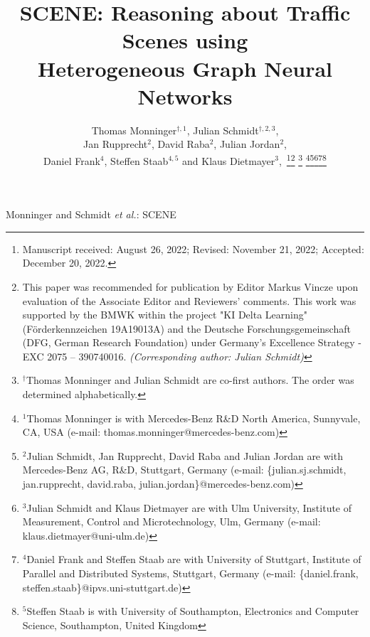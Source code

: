 \documentclass[letterpaper, 10 pt, journal, twoside]{IEEEtran}
\begin{document}
\title{SCENE: Reasoning about Traffic Scenes using\\Heterogeneous Graph Neural Networks}

\author{Thomas Monninger$^{\dagger, 1}$, Julian Schmidt$^{\dagger, 2, 3}$,\\Jan Rupprecht$^{2}$, David Raba$^{2}$, Julian Jordan$^{2}$,\\Daniel Frank$^{4}$, Steffen Staab$^{4, 5}$ and Klaus Dietmayer$^{3}$,~\thanks{Manuscript received: August 26, 2022; Revised: November 21, 2022; Accepted: December 20, 2022.}\thanks{This paper was recommended for publication by Editor Markus Vincze upon evaluation of the Associate Editor and Reviewers' comments.
This work was supported by the BMWK within the project "KI Delta Learning" (F\"orderkennzeichen 19A19013A) and the Deutsche Forschungsgemeinschaft (DFG, German Research Foundation) under Germany's Excellence Strategy - EXC 2075 – 390740016. \textit{(Corresponding author: Julian Schmidt)}} \thanks{$^{\dagger}$Thomas Monninger and Julian Schmidt are co-first authors. The order was determined alphabetically.}
\thanks{$^{1}$Thomas Monninger is with Mercedes-Benz R\&D North America, Sunnyvale, CA, USA (e-mail: thomas.monninger@mercedes-benz.com)}\thanks{$^{2}$Julian Schmidt, Jan Rupprecht, David Raba and Julian Jordan are with Mercedes-Benz AG, R\&D, Stuttgart, Germany (e-mail: \{julian.sj.schmidt, jan.rupprecht, david.raba, julian.jordan\}@mercedes-benz.com)}\thanks{$^{3}$Julian Schmidt and Klaus Dietmayer are with Ulm University, Institute of Measurement, Control and Microtechnology, Ulm, Germany (e-mail: klaus.dietmayer@uni-ulm.de)}\thanks{$^{4}$Daniel Frank and Steffen Staab are with University of Stuttgart, Institute of Parallel and Distributed Systems, Stuttgart, Germany (e-mail: \{daniel.frank, steffen.staab\}@ipvs.uni-stuttgart.de)}\thanks{$^{5}$Steffen Staab is with University of Southampton, Electronics and Computer Science, Southampton, United Kingdom}}

{Monninger and Schmidt \MakeLowercase{\textit{et al.}}: SCENE} 

\maketitle
\end{document}
